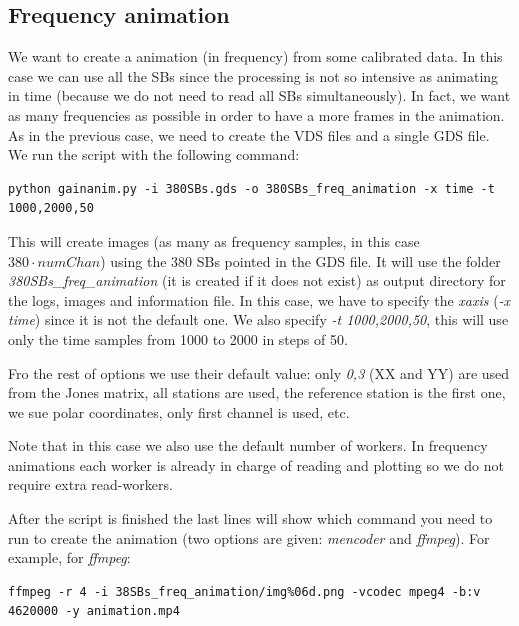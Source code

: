 \documentclass[a4paper,11pt]{article}
\begin{document}
\subsection {Frequency animation}

We want to create a animation (in frequency) from some calibrated data. In this case we can use all the SBs since the processing is not so intensive as animating in time (because we do not need to read all SBs simultaneously). In fact, we want as many frequencies as possible in order to have a more frames in the animation. As in the previous case, we need to create the VDS files and a single GDS file. We run the script with the following command:

\begin{small}
\begin{verbatim}
python gainanim.py -i 380SBs.gds -o 380SBs_freq_animation -x time -t 1000,2000,50
\end{verbatim}
\end{small}

This will create images (as many as frequency samples, in this case $380 \cdot numChan$) using the 380 SBs pointed in the GDS file. It will use the folder \textit{380SBs\_freq\_animation} (it is created if it does not exist) as output directory for the logs, images and information file. In this case, we have to specify the \textit{xaxis} (\textit{-x time}) since it is not the default one. We also specify \textit{-t 1000,2000,50}, this will use only the time samples from 1000 to 2000 in steps of 50. 

Fro the rest of options we use their default value: only \textit{0,3} (XX and YY) are used from the Jones matrix, all stations are used, the reference station is the first one, we sue polar coordinates, only first channel is used, etc. 

Note that in this case we also use the default number of workers. In frequency animations each worker is already in charge of reading and plotting so we do not require extra read-workers.

After the script is finished the last lines will show which command you need to run to create the animation (two options are given: \textit{mencoder} and \textit{ffmpeg}). For example, for \textit{ffmpeg}:

\begin{small}
\begin{verbatim}
ffmpeg -r 4 -i 38SBs_freq_animation/img%06d.png -vcodec mpeg4 -b:v 4620000 -y animation.mp4
\end{verbatim}
\end{small}
\end{document}
